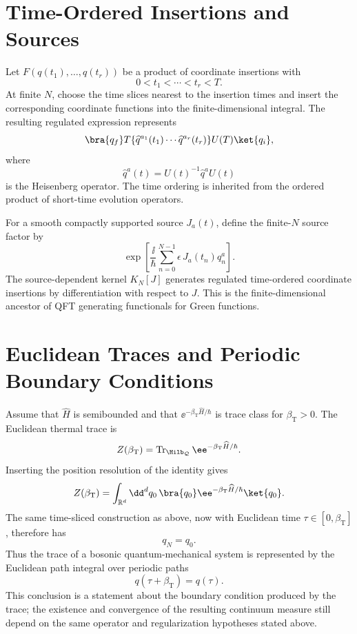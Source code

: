 \section{Time-Ordered Insertions and Sources}

Let \(F(q(t_1),\ldots,q(t_r))\) be a product of coordinate insertions with
\[
  0<t_1<\cdots<t_r<T.
\]
At finite \(N\), choose the time slices nearest to the insertion times and
insert the corresponding coordinate functions into the finite-dimensional
integral. The resulting regulated expression represents
\[
  \bra{q_f}T\{\widehat q^{a_1}(t_1)\cdots
  \widehat q^{a_r}(t_r)\}U(T)\ket{q_i},
\]
where
\[
  \widehat q^a(t)
  =
  U(t)^{-1}\widehat q^aU(t)
\]
is the Heisenberg operator. The time ordering is inherited from the ordered
product of short-time evolution operators.

For a smooth compactly supported source \(J_a(t)\), define the finite-\(N\)
source factor by
\[
  \exp\left[
    \frac{\ii}{\hbar}
    \sum_{n=0}^{N-1}\epsilon\,J_a(t_n)q_n^a
  \right].
\]
The source-dependent kernel \(K_N[J]\) generates regulated time-ordered
coordinate insertions by differentiation with respect to \(J\). This is the
finite-dimensional ancestor of QFT generating functionals for Green
functions.

\section{Euclidean Traces and Periodic Boundary Conditions}

Assume that \(\widehat H\) is semibounded and that
\(\ee^{-\beta_{\mathrm T}\widehat H/\hbar}\) is trace class for
\(\beta_{\mathrm T}>0\). The Euclidean thermal trace is
\[
  Z(\beta_{\mathrm T})
  =
  \operatorname{Tr}_{\Hilb_{\mathcal Q}}
  \ee^{-\beta_{\mathrm T}\widehat H/\hbar}.
\]
Inserting the position resolution of the identity gives
\[
  Z(\beta_{\mathrm T})
  =
  \int_{\mathbb R^d}\dd^dq_0\,
  \bra{q_0}
  \ee^{-\beta_{\mathrm T}\widehat H/\hbar}
  \ket{q_0}.
\]
The same time-sliced construction as above, now with Euclidean time
\(\tau\in[0,\beta_{\mathrm T}]\), therefore has
\[
  q_N=q_0 .
\]
Thus the trace of a bosonic quantum-mechanical system is represented by the
Euclidean path integral over periodic paths
\[
  q(\tau+\beta_{\mathrm T})=q(\tau).
\]
This conclusion is a statement about the boundary condition produced by the
trace; the existence and convergence of the resulting continuum measure still
depend on the same operator and regularization hypotheses stated above.


